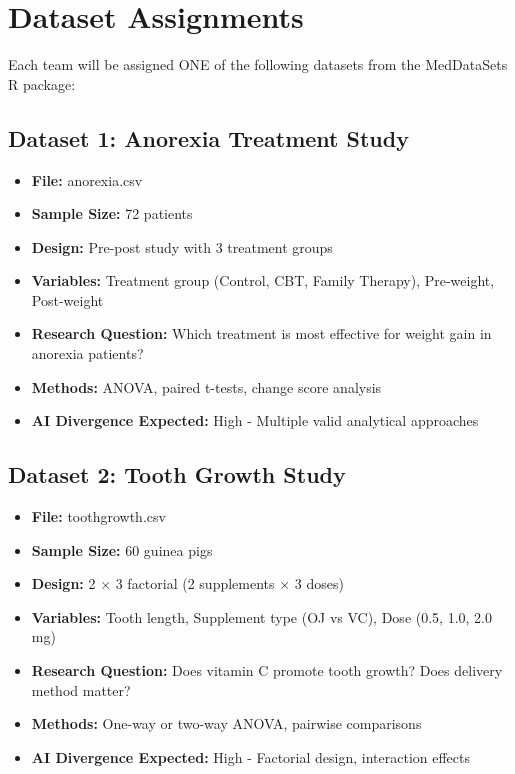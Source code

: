 \documentclass[11pt]{article}
\begin{document}
\section{Dataset Assignments}

Each team will be assigned ONE of the following datasets from the MedDataSets R package:

\subsection{Dataset 1: Anorexia Treatment Study}
\begin{itemize}
\item \textbf{File:} anorexia.csv
\item \textbf{Sample Size:} 72 patients
\item \textbf{Design:} Pre-post study with 3 treatment groups
\item \textbf{Variables:} Treatment group (Control, CBT, Family Therapy), Pre-weight, Post-weight
\item \textbf{Research Question:} Which treatment is most effective for weight gain in anorexia patients?
\item \textbf{Methods:} ANOVA, paired t-tests, change score analysis
\item \textbf{AI Divergence Expected:} High - Multiple valid analytical approaches
\end{itemize}

\subsection{Dataset 2: Tooth Growth Study}
\begin{itemize}
\item \textbf{File:} toothgrowth.csv
\item \textbf{Sample Size:} 60 guinea pigs
\item \textbf{Design:} 2 $\times$ 3 factorial (2 supplements $\times$ 3 doses)
\item \textbf{Variables:} Tooth length, Supplement type (OJ vs VC), Dose (0.5, 1.0, 2.0 mg)
\item \textbf{Research Question:} Does vitamin C promote tooth growth? Does delivery method matter?
\item \textbf{Methods:} One-way or two-way ANOVA, pairwise comparisons
\item \textbf{AI Divergence Expected:} High - Factorial design, interaction effects
\end{itemize}
\end{document}
